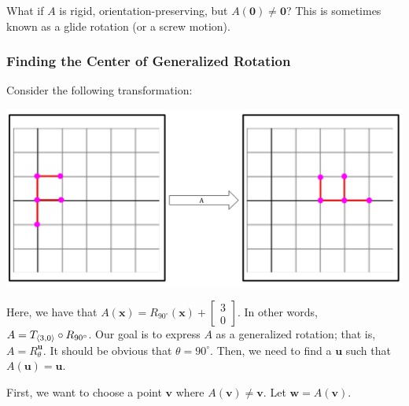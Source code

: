 \documentclass[letterpaper]{article}
\begin{document}
What if $A$ is rigid, orientation-preserving, but $A(\mathbf{0}) \neq \mathbf{0}$? This is sometimes known as a glide rotation (or a screw motion).

\subsubsection{Finding the Center of Generalized Rotation}
Consider the following transformation:
\begin{center}
    \includegraphics[scale=0.4]{../assets/gener.png}
\end{center}
Here, we have that $A(\mathbf{x}) = R_{90^{\circ}}(\mathbf{x}) + \begin{bmatrix}
    3 \\ 0
\end{bmatrix}$. In other words, $A = T_{\langle 3, 0 \rangle} \circ R_{90^{\circ}}$. Our goal is to express $A$ as a generalized rotation; that is, $A = R_{\theta}^{\mathbf{u}}$. It should be obvious that $\theta = 90^{\circ}$. Then, we need to find a $\mathbf{u}$ such that $A(\mathbf{u}) = \mathbf{u}$. 

\bigskip 

First, we want to choose a point $\mathbf{v}$ where $A(\mathbf{v}) \neq \mathbf{v}$. Let $\mathbf{w} = A(\mathbf{v})$.
\end{document}
